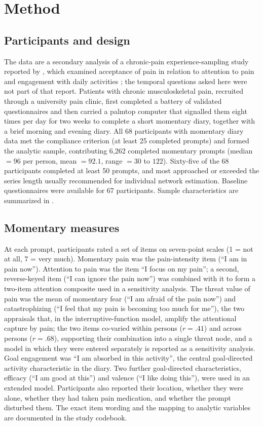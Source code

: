 \documentclass[11pt,a4paper]{article}
\begin{document}
\section{Method}

\subsection{Participants and design}
The data are a secondary analysis of a chronic-pain experience-sampling study reported by
\citet{viane2004acceptance}, which examined acceptance of pain in relation to attention to pain
and engagement with daily activities \citep[see also][]{viane2003acceptance}; the temporal
questions asked here were not part of that report. Patients with chronic musculoskeletal pain,
recruited through a university pain clinic, first
completed a battery of validated questionnaires and then carried a palmtop computer that
signalled them eight times per day for two weeks to complete a short momentary diary, together
with a brief morning and evening diary. All 68 participants with momentary diary data met the
compliance criterion (at least 25 completed prompts) and formed the analytic sample,
contributing 6,262 completed momentary prompts (median $=96$ per person, mean $=92.1$, range
$=30$ to $122$). Sixty-five of the 68 participants completed at least 50 prompts, and most
approached or exceeded the series length usually recommended for individual network estimation.
Baseline questionnaires were available for 67 participants. Sample characteristics are summarized
in .



\subsection{Momentary measures}
At each prompt, participants rated a set of items on seven-point scales (1 = not at all,
7 = very much). Momentary pain was the pain-intensity item (``I am in pain now''). Attention to
pain was the item ``I focus on my pain''; a second, reverse-keyed item (``I can ignore the pain
now'') was combined with it to form a two-item attention composite used in a sensitivity
analysis. The threat value of pain was the mean of momentary fear (``I am afraid of the pain
now'') and catastrophizing (``I feel that my pain is becoming too much for me''), the two
appraisals that, in the interruptive-function model, amplify the attentional capture by pain; the
two items co-varied within persons ($r=.41$) and across persons ($r=.68$), supporting their
combination into a single threat node, and a model in which they were entered separately is
reported as a sensitivity analysis. Goal engagement was ``I am absorbed in this activity'', the
central goal-directed activity characteristic in the diary. Two further goal-directed
characteristics, efficacy (``I am good at this'') and valence (``I like doing this''), were used
in an extended model. Participants also reported their location, whether they were alone, whether
they had taken pain medication, and whether the prompt disturbed them. The exact item wording and
the mapping to analytic variables are documented in the study codebook.
\end{document}
